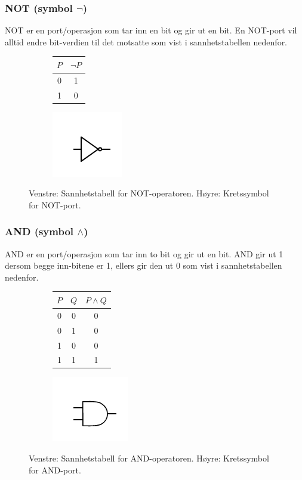 \subsubsection{NOT (symbol $\neg$)}
NOT er en port/operasjon som tar inn en bit og gir ut en bit. En NOT-port vil alltid endre bit-verdien til det motsatte som vist i sannhetstabellen nedenfor.
\begin{center}
\begin{figure}[h]
\begin{subfigure}{.3\textwidth}
	\begin{tabular}{|c|c|}
	\hline
	$P$ & $\neg P$ \\
	\hline
	0 & 1 \\
	1 & 0 \\
	\hline
	\end{tabular}
\end{subfigure}
\begin{subfigure}{.3\textwidth}
	\includegraphics{./gate_not}
\end{subfigure}
\caption{Venstre: Sannhetstabell for NOT-operatoren. Høyre: Kretssymbol for NOT-port.}
\end{figure}
\end{center}

\subsubsection{AND (symbol $\land$)}
AND er en port/operasjon som tar inn to bit og gir ut en bit. AND gir ut 1 dersom begge inn-bitene er 1, ellers gir den ut 0 som vist i sannhetstabellen nedenfor.
\begin{center}
\begin{figure}[h]
\begin{subfigure}{.3\textwidth}
	\begin{tabular}{|c|c|c|}
	\hline
	$P$ & $Q$ & $P \land Q$ \\
	\hline
	0 & 0 & 0\\
	0 & 1 & 0 \\
	1 & 0 & 0 \\
	1 & 1 & 1 \\
	\hline
	\end{tabular}
\end{subfigure}
\begin{subfigure}{.3\textwidth}
	\includegraphics{./gate_and}
\end{subfigure}
\caption{Venstre: Sannhetstabell for AND-operatoren. Høyre: Kretssymbol for AND-port.}
\end{figure}
\end{center}

